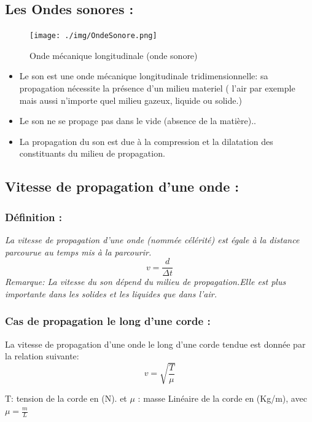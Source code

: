 \documentclass[12pt]{article}
\begin{document}
\subsection{Les Ondes sonores :}
\begin{figure}[h]
		\begin{center}
	\texttt{[image: ./img/OndeSonore.png]}
	\vspace{-0.5cm}
	\caption{Onde mécanique longitudinale (onde sonore)}
\end{center}
\end{figure}
\begin{itemize}
	\vspace{-1.3cm}
\item Le son est une onde mécanique longitudinale tridimensionnelle: sa propagation nécessite la présence d'un milieu materiel ( l'air par exemple mais aussi n'importe quel milieu gazeux, liquide ou solide.)
\item Le son ne se propage pas dans le vide (absence de la matière)..
\item La propagation du son est due à la compression et la dilatation des constituants du milieu de propagation.
\end{itemize}

\subsection{Vitesse de propagation d'une onde :}
\subsubsection{Définition : }
\begin{tcolorbox}
	
	\textit{La vitesse de propagation d'une onde (nommée célérité) est égale à la distance parcourue au temps mis à la parcourir.$$v = \frac{d}{\Delta{t}}$$
	Remarque:	La vitesse du son dépend du milieu de propagation.Elle est plus importante dans les solides et les liquides que dans l'air.}

\end{tcolorbox}
\subsubsection{Cas de propagation le long d'une corde : }
La vitesse de propagation d'une onde le long d'une corde tendue est donnée par la relation suivante: $$ v = \sqrt{\frac{T}{\mu}}$$

T: tension de la corde en (N).
et $\mu$ : masse Linéaire de la corde en (Kg/m), avec $\mu = \frac{m}{L}$
\end{document}
